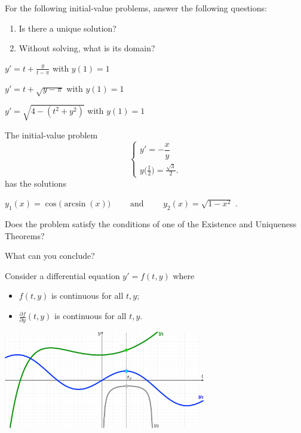 \newpage

\question For the following initial-value problems, answer the following questions:
\begin{enumerate}[label=\color{gray}(\alph*)]
\item Is there a unique solution?

\item Without solving, what is its domain?
\end{enumerate}




\begin{parts}
	\item $y' = t + \frac{y}{t-\pi}$ with $y(1) = 1$
	\item $y' = t + \sqrt{y-\pi}$ with $y(1) = 1$
	\item $y' = \sqrt{4 - (t^2+y^2)}$ with $y(1) = 1$
\end{parts}


\bookonlynewpage


\question The initial-value problem
$$
\begin{cases}
y' = -\dfrac{x}{y} \\
y\big(\frac12\big) = \frac{\sqrt{3}}{2}.
\end{cases}
$$
has the solutions

\hfil $y_1(x) = \cos\big( \arcsin (x) \big) \qquad \text{ and } \qquad y_2(x) = \sqrt{1-x^2}$ \quad . 

\begin{parts}
\item Does the problem satisfy the conditions of one of the Existence and Uniqueness Theorems?

\item What can you conclude?

\end{parts}


\bookonlynewpage

\begin{minipage}{.5\textwidth}
\question Consider a differential equation $y' = f(t,y)$ where 
\begin{itemize}
	\item $f(t,y)$ is continuous for all $t,y$;
	\item $\frac{\partial f}{\partial y}(t,y)$ is continuous for all $t,y$.
\end{itemize}
\end{minipage}
\hfill
\begin{minipage}{250pt}
	\includegraphics*[width=250pt]{images/module13-3graphs.pdf}
\end{minipage}



